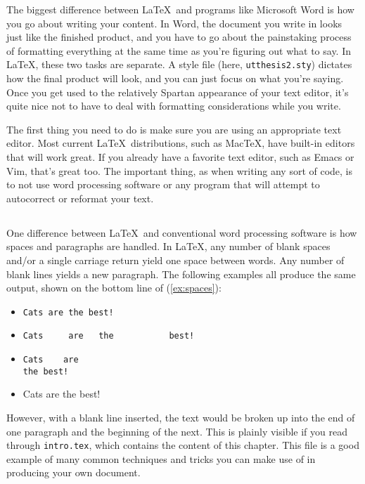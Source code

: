 The biggest difference between \LaTeX ~and programs like Microsoft Word is how
you go about writing your content. In Word, the document you write in looks
just like the finished product, and you have to go about the painstaking
process of formatting everything at the same time as you're figuring out what
to say. In \LaTeX, these two tasks are separate. A style file (here,
{\tt utthesis2.sty}) dictates how the final product will look, and you can
just focus on what you're saying. Once you get used to the relatively Spartan
appearance of your text editor, it's quite nice not to have to deal with
formatting considerations while you write.

The first thing you need to do is make sure you are using an appropriate text
editor. Most current \LaTeX ~distributions, such as MacTeX, have
built-in editors that will work great. If you already have a favorite text
editor, such as Emacs or Vim, that's great too. The important thing, as when
writing any sort of code, is to not use word processing software or any program
that will attempt to autocorrect or reformat your text.

\subsection{}
One difference between \LaTeX ~and conventional word
processing software is how spaces and paragraphs are handled. In \LaTeX, 
any number of blank spaces and/or a single carriage return yield one space
between words. Any number of blank lines yields a new paragraph. The following
examples all produce the same output, shown on the bottom line of
(\ref{ex:spaces}):

\begin{exe}
  \ex \label{ex:spaces}
  \begin{itemize}
    \item \verb+Cats are the best!+
    \item \verb+Cats     are   the           best!+
    \item \verb+Cats    are+ \\ \verb+the best!+
    \item Cats are the best!
  \end{itemize}
\end{exe} 
%
However, with a blank line inserted, the text would be broken up into the
end of one paragraph and the beginning of the next. This is plainly visible
if you read through {\tt intro.tex}, which contains the content of this chapter.
This file is a good example of many common techniques and tricks you can make
use of in producing your own document.

